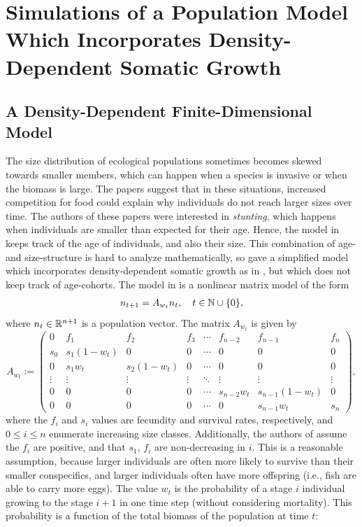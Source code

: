 \chapter{Simulations of a Population Model Which Incorporates Density-Dependent Somatic Growth}

\section{A Density-Dependent Finite-Dimensional Model} \label{section:finitedim}

The size distribution of ecological populations sometimes becomes skewed towards smaller members, which can happen when a species is invasive or when the biomass is large. The papers \cite{Chizinski2010, Ylikarjula1999} suggest that in these situations, increased competition for food could explain why individuals do not reach larger sizes over time. The authors of these papers were interested in \emph{stunting}, which happens when individuals are smaller than expected for their age. Hence, the model in \cite{Chizinski2010, Ylikarjula1999} keeps track of the age of individuals, and also their size. This combination of age- and size-structure is hard to analyze mathematically, so \cite{Callahan2019} gave a simplified model which incorporates density-dependent somatic growth as in \cite{Chizinski2010, Ylikarjula1999}, but which does not keep track of age-cohorts. The model in \cite{Callahan2019} is a nonlinear matrix model of the form
\begin{align}
	n_{t+1} = A_{w_t} n_t, \quad t \in \mathbb{N} \cup \{0\}, \label{eqn:matrixsystem}
\end{align}
where $n_t \in \mathbb{R}^{n+1}$ is a population vector. The matrix $A_{w_t}$ is given by
\[A_{w_t}:= \begin{pmatrix}
0 & f_1 & f_2 & f_3 & \cdots & f_{n-2} & f_{n-1} & f_n \\
s_0 & s_1(1-w_t) & 0 & 0 & \cdots & 0 & 0 & 0 \\
0 & s_1 w_t & s_2(1 - w_t) & 0 & \cdots & 0 & 0 & 0 \\
\vdots & \vdots & \vdots & \vdots & \ddots & \vdots & \vdots & \vdots \\
0 & 0 & 0 & 0 &\cdots & s_{n-2} w_t & s_{n-1} (1- w_t) & 0 \\
0 & 0 & 0 & 0 & \cdots & 0 & s_{n-1} w_t & s_n
\end{pmatrix},\]
where the $f_i$ and $s_i$ values are fecundity and survival rates, respectively, and $0 \leq i \leq n$ enumerate increasing size classes. Additionally, the authors of \cite{Callahan2019} assume the $f_i$ are positive, and that $s_1$, $f_i$ are non-decreasing in $i$. This is a reasonable assumption, because larger individuals are often more likely to survive than their smaller conspecifics, and larger  individuals often have more offspring (i.e., fish are able to carry more eggs). The value $w_t$ is the probability of a stage $i$ individual growing to the stage $i+1$ in one time step (without considering mortality). This probability is a function of the total biomass of the population at time $t$:
